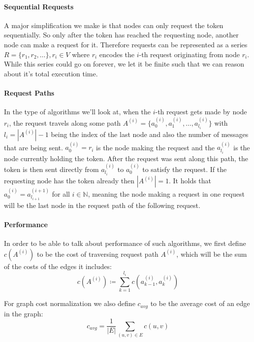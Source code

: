 \documentclass[a4paper, oneside]{discothesis}
\begin{document}
\paragraph{Sequential Requests} A major simplification we make is that nodes can only request the token sequentially. So only after the token has reached the requesting node, another node can make a request for it. Therefore requests can be represented as a series $R=\{r_1,r_2,\dots\},r_i\in V$ where $r_i$ encodes the $i$-th request originating from node $r_i$. While this series could go on forever, we let it be finite such that we can reason about it's total execution time.

\paragraph{Request Paths} In the type of algorithms we'll look at, when the $i$-th request gets made by node $r_i$, the request travels along some path $A^{(i)}=\{a^{(i)}_0,a^{(i)}_1,\dots,a^{(i)}_{l_i}\}$ with $l_i=|A^{(i)}|-1$ being the index of the last node and also the number of messages that are being sent. $a^{(i)}_0=r_i$ is the node making the request and the $a^{(i)}_{l_i}$ is the node currently holding the token. After the request was sent along this path, the token is then sent directly from $a^{(i)}_{l_i}$ to $a^{(i)}_0$ to satisfy the request. If the requesting node has the token already then $|A^{(i)}|=1$. It holds that $a^{(i)}_0=a^{(i+1)}_{l_{i+1}}$ for all $i\in\mathbb{N}$, meaning the node making a request in one request will be the last node in the request path of the following request.

\paragraph{Performance}\label{model-perf} In order to be able to talk about performance of such algorithms, we first define $c(A^{(i)})$ to be the cost of traversing request path $A^{(i)}$, which will be the sum of the costs of the edges it includes:
\begin{equation}
c(A^{(i)})\coloneqq\sum_{k=1}^{l_i}c(a^{(i)}_{k-1}, a^{(i)}_k)
\end{equation}

For graph cost normalization we also define $c_{avg}$ to be the average cost of an edge in the graph:
\begin{equation}
c_{avg}=\frac{1}{|E|}\sum_{(u,v)\in E}c(u,v)
\end{equation}
\end{document}

